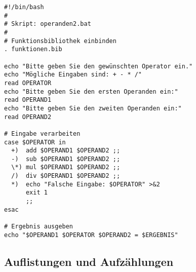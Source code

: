 \documentclass{llncs}
\begin{document}
\lstset{
language=Bash,
captionpos=b, 
caption=Das ist die Unterschrift des Quellcodes, 
label=QuellcodeBeispielNr1,
basicstyle=\ttfamily\footnotesize,      %
keywordstyle=\color{FrankfurtBlue},     %
commentstyle=\color{gray},              %
numbers=left,                           %
numberstyle=\footnotesize,              %
stepnumber=1,                           %
numbersep=5pt,                          %
backgroundcolor=\color{lightlightgray}, %
frame=none,                             %
tabsize=2,                              %
captionpos=b,                           %
breaklines=true,                        %
breakatwhitespace=false,                %
showspaces=false,                       %
showstringspaces=false                  %
showtabs=false,                         %
columns=fixed,                          %
morekeywords={},                        %
literate=%
{Ö}{{\"O}}1
{Ä}{{\"A}}1
{Ü}{{\"U}}1
{ö}{{\"o}}1
{ä}{{\"a}}1
{ü}{{\"u}}1
{ß}{{\ss}}1
{~}{{\textasciitilde}}1
}
\begin{lstlisting}
#!/bin/bash
#
# Skript: operanden2.bat
#
# Funktionsbibliothek einbinden
. funktionen.bib

echo "Bitte geben Sie den gewünschten Operator ein."
echo "Mögliche Eingaben sind: + - * /"
read OPERATOR
echo "Bitte geben Sie den ersten Operanden ein:"
read OPERAND1
echo "Bitte geben Sie den zweiten Operanden ein:"
read OPERAND2

# Eingabe verarbeiten 
case $OPERATOR in
  +)  add $OPERAND1 $OPERAND2 ;;
  -)  sub $OPERAND1 $OPERAND2 ;;
  \*) mul $OPERAND1 $OPERAND2 ;;
  /)  div $OPERAND1 $OPERAND2 ;;
  *)  echo "Falsche Eingabe: $OPERATOR" >&2
      exit 1
      ;;
esac

# Ergebnis ausgeben
echo "$OPERAND1 $OPERATOR $OPERAND2 = $ERGEBNIS"
\end{lstlisting}

\subsection{Auflistungen und Aufzählungen}
\end{document}
